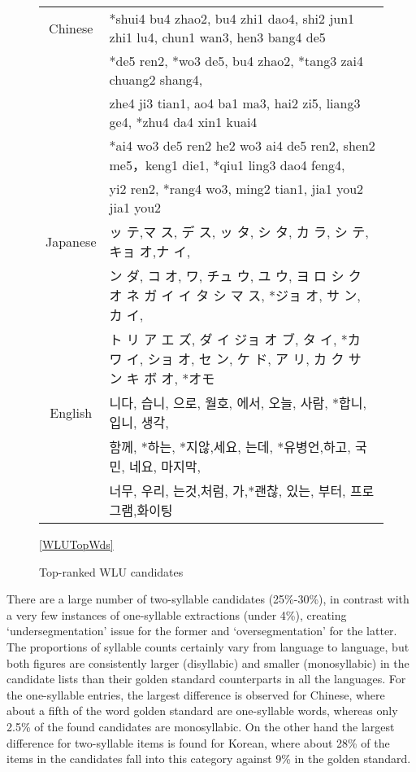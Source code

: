 \documentclass[a4]{article}
\newcommand\korean{\CJKfamily{korm}\CJKspace}
\begin{document}
\begin{figure}
\begin{tabular}{c |l}
\centering
Chinese & *shui4 bu4 zhao2, bu4 zhi1 dao4, shi2 jun1 zhi1 lu4, chun1 wan3, hen3 bang4 de5 \\
& 	*de5 ren2, *wo3 de5, bu4 zhao2, *tang3 zai4 chuang2 shang4, \\
&     zhe4 ji3 tian1, ao4 ba1 ma3, hai2 zi5, liang3 ge4, *zhu4 da4 xin1 kuai4\\
&	*ai4 wo3 de5 ren2 he2 wo3 ai4 de5 ren2, shen2 me5，keng1 die1, *qiu1 ling3 dao4 feng4,\\
&	yi2 ren2, *rang4 wo3, ming2 tian1, jia1 you2 jia1 you2\\
\hline
Japanese & {\small ッ テ,マ ス, 	デ ス,	ッ タ,	シ タ,	カ ラ,	シ テ,	キョ オ,ナ イ,}\\
 & {\small *ン ダ,	コ オ,	ワ, チュ ウ,	ユ ウ,	ヨ ロ シ ク オ ネ ガ イ イ タ シ マ ス,	*ジョ オ, 	サ ン, 	カ イ,}\\ 	
& {\small ト リ ア エ ズ,	ダ イ ジョ オ ブ, 	タ イ,		*カ ワ イ, 	ショ オ, 	セ ン, 	ケ ド, 	ア リ,	カ ク サ ン キ ボ オ, 	*オモ}\\
\hline
English & {\korean 니다,	습니,	으로,	월호,	에서,	오늘,	사람,	*합니,	입니,	생각,}\\&	{\korean 함께,	*하는,	*지않,세요,	는데,	*유병언,하고,	국민,		네요,	마지막,	}\\
&	{\korean 너무,	우리,	는것,처럼,	가,*괜찮,	있는,	부터,	프로그램,화이팅}\\


\end{tabular}

\ref{WLUTopWds}
\caption{Top-ranked WLU candidates}

\end{figure}


There are a large number of two-syllable candidates (25\%-30\%), in contrast with a very few instances of one-syllable extractions (under 4\%), creating `undersegmentation' issue for the former and `oversegmentation' for the latter. The proportions of syllable counts certainly vary from language to language, but both figures are consistently larger (disyllabic) and smaller (monosyllabic) in the candidate lists than their golden standard counterparts in all the languages. For the one-syllable entries, the largest difference is observed for Chinese, where about a fifth of the word golden standard are one-syllable words, whereas only 2.5\% of the found candidates are monosyllabic. On the other hand the largest difference for two-syllable items is found for Korean, where about 28\% of the items in the candidates fall into this category against 9\% in the golden standard. 
\end{document}
